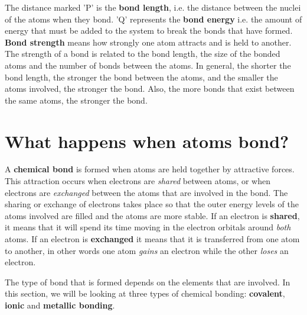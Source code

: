 The distance marked 'P' is the \textbf{bond length}, i.e. the distance between the nuclei of the atoms when they bond. 'Q' represents the \textbf{bond energy} i.e. the amount of energy that must be added to the system to break the bonds that have formed. \textbf{Bond strength} means how strongly one atom attracts and is held to another. The strength of a bond is related to the bond length, the size of the bonded atoms and the number of bonds between the atoms. In general, the shorter the bond length, the stronger the bond between the atoms, and the smaller the atoms involved, the stronger the bond. Also, the more bonds that exist between the same atoms, the stronger the bond.\\





\section{What happens when atoms bond?}
\label{sec:bonding:what happens}

A \textbf{chemical bond} is formed when atoms are held together by attractive forces. This attraction occurs when electrons are \textit{shared} between atoms, or when electrons are \textit{exchanged} between the atoms that are involved in the bond. The sharing or exchange of electrons takes place so that the outer energy levels of the atoms involved are filled and the atoms are more stable. If an electron is \textbf{shared}, it means that it will spend its time moving in the electron orbitals around \textit{both} atoms. If an electron is \textbf{exchanged} it means that it is transferred from one atom to another, in other words one atom \textit{gains} an electron while the other \textit{loses} an electron.


The type of bond that is formed depends on the elements that are involved. In this section, we will be looking at three types of chemical bonding: \textbf{covalent}, \textbf{ionic} and \textbf{metallic bonding}.

